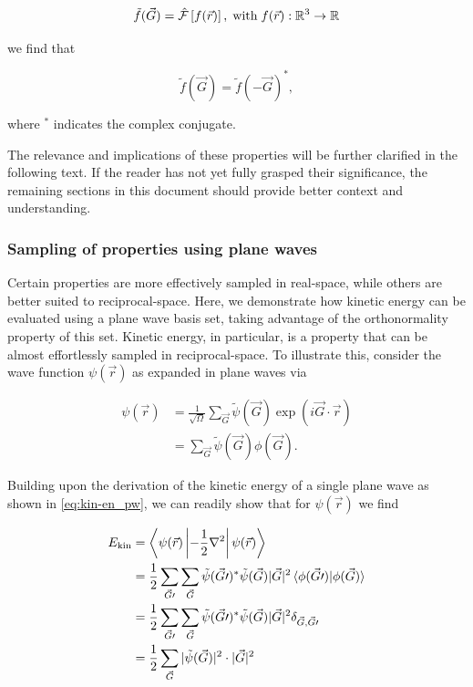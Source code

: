 \begin{itemize}
    \begin{equation}
        \tilde{f}(\vec{G}) = \hat{\mathcal{F}}\left[f(\vec{r})\right],\;\text{with}\;f(\vec{r}): \mathbb{R}^{3} \rightarrow \mathbb{R}
    \end{equation}
    
    we find that
    
    \begin{equation}
        \tilde{f}(\vec{G}) = \tilde{f}(-\vec{G})^{*},
    \end{equation}

    where $^{*}$ indicates the complex conjugate.
    
\end{itemize}

The relevance and implications of these properties will be further clarified in the following text. If the reader has not yet fully grasped their significance, the remaining sections in this document should provide better context and understanding.

%
%
%
\subsubsection{Sampling of properties using plane waves}

Certain properties are more effectively sampled in real-space, while others are better suited to reciprocal-space. Here, we demonstrate how kinetic energy can be evaluated using a plane wave basis set, taking advantage of the orthonormality property of this set. Kinetic energy, in particular, is a property that can be almost effortlessly sampled in reciprocal-space. To illustrate this, consider the wave function $\psi(\vec{r})$ as expanded in plane waves via

\begin{align}
    \psi(\vec{r}) &= \frac{1}{\sqrt{\Omega}} \sum_{\vec{G}} \tilde{\psi}(\vec{G}) \exp \left(i \vec{G} \cdot \vec{r} \right) \\
    &= \sum_{\vec{G}} \tilde{\psi}(\vec{G}) \phi(\vec{G}).
\end{align}

Building upon the derivation of the kinetic energy of a single plane wave as shown in \cref{eq:kin-en_pw}, we can readily show that for $\psi(\vec{r})$ we find

\begin{align}
    E_{\text{kin}} &= \left<\psi(\vec{r})\left|-\frac{1}{2}\nabla^{2}\right|\psi(\vec{r})\right> \\
    &= \frac{1}{2} \sum_{\vec{G}\prime}\sum_{\vec{G}} \tilde{\psi}(\vec{G}\prime)^{*} \tilde{\psi}(\vec{G}) |\vec{G}|^{2} \braket{\phi(\vec{G}\prime)|\phi(\vec{G})} \\
    &= \frac{1}{2} \sum_{\vec{G}\prime}\sum_{\vec{G}} \tilde{\psi}(\vec{G}\prime)^{*} \tilde{\psi}(\vec{G}) |\vec{G}|^{2} \delta_{\vec{G},\vec{G}\prime} \\
    &=\frac{1}{2}\sum_{\vec{G}} |\tilde{\psi}(\vec{G})|^{2} \cdot |\vec{G}|^{2}
    \label{eq:kin_en}
\end{align}


